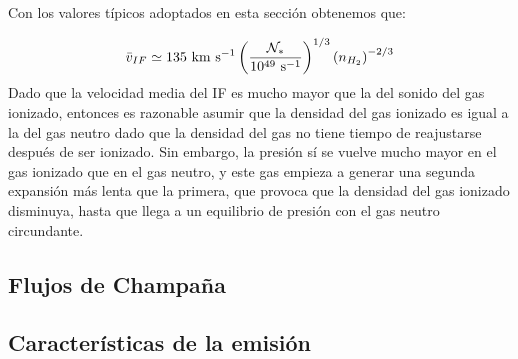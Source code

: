 Con los valores típicos adoptados en esta sección obtenemos que:

\begin{align}
  \bar{v}_{IF}\simeq 135\mathrm{~km~s^{-1}}\left(\frac{\mathcal{N}_*}{10^{49}\mathrm{~s^{-1}}}\right)^{1/3}\left(n_{H_2}\right)^{-2/3}
\end{align}
Dado que la velocidad media del IF es mucho mayor que la del sonido del gas ionizado, entonces es razonable asumir que la densidad del gas ionizado es igual a la del gas neutro dado que la densidad del gas no tiene tiempo de reajustarse después de ser ionizado. Sin embargo, la presión sí se vuelve mucho mayor en el gas ionizado que en el gas neutro, y este gas empieza a generar una segunda expansión más lenta que la primera, que provoca que la densidad del gas ionizado disminuya, hasta que llega a un equilibrio de presión con el gas neutro circundante.
\subsection{Flujos de Champaña}
\subsection{Características de la emisión}

